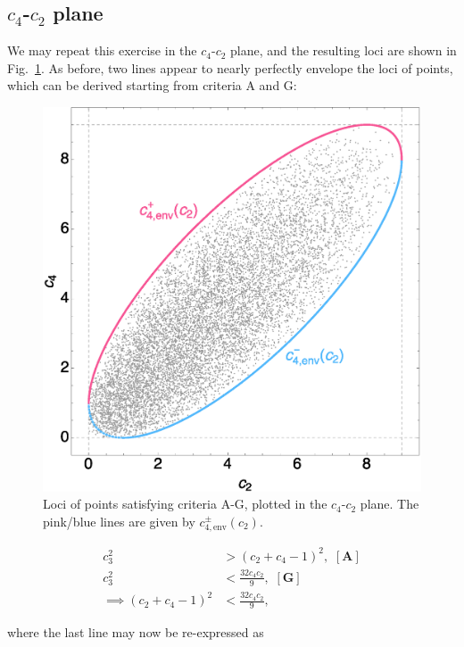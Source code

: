 \subsection{$c_4$-$c_2$ plane}
\label{sub:c4c2plane}

We may repeat this exercise in the $c_4$-$c_2$ plane, and the resulting loci
are shown in Fig.~\ref{fig:c4c2surface}. As before, two lines appear to 
nearly perfectly envelope the loci of points, which can be derived starting from
criteria A and G:

\begin{figure}
\includegraphics[width=\columnwidth]{c4c2surface.eps}
\caption{
Loci of points satisfying criteria A-G, plotted in the $c_4$-$c_2$ plane.
The pink/blue lines are given by $c_{4,\mathrm{env}}^{\pm}(c_2)$.
}
\label{fig:c4c2surface}
\end{figure}

\begin{align}
c_3^2 &> (c_2 + c_4 - 1)^2,\,\,\mathbf{[A]}\nonumber\\
c_3^2 &< \frac{32 c_4 c_2}{9},\,\,\mathbf{[G]}\nonumber\\
\implies (c_2 + c_4 - 1)^2 &< \frac{32 c_4 c_2}{9},
\end{align}

where the last line may now be re-expressed as

